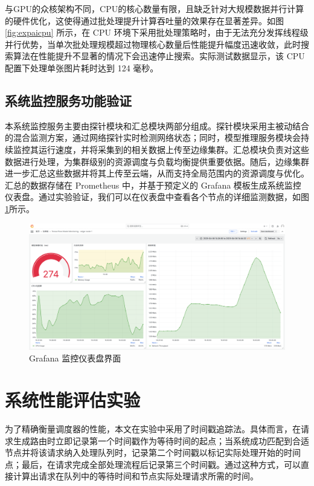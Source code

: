 与GPU的众核架构不同，CPU的核心数量有限，且缺乏针对大规模数据并行计算的硬件优化，这使得通过批处理提升计算吞吐量的效果存在显著差异。如图 \ref{fig:expaicpu} 所示，在 CPU 环境下采用批处理策略时，由于无法充分发挥线程级并行优势，当单次批处理规模超过物理核心数量后性能提升幅度迅速收敛，此时搜索算法在性能提升不显著的情况下会迅速停止搜索。实际测试数据显示，该 CPU 配置下处理单张图片耗时达到 124 毫秒。

\subsection{系统监控服务功能验证}

本系统监控服务主要由探针模块和汇总模块两部分组成。探针模块采用主被动结合的混合监测方案，通过网络探针实时检测网络状态；同时，模型推理服务模块会持续监控其运行速度，并将采集到的相关数据上传至边缘集群。汇总模块负责对这些数据进行处理，为集群级别的资源调度与负载均衡提供重要依据。随后，边缘集群进一步汇总这些数据并将其上传至云端，从而支持全局范围内的资源调度与优化。汇总的数据存储在 Prometheus 中，并基于预定义的 Grafana 模板生成系统监控仪表盘。通过实验验证，我们可以在仪表盘中查看各个节点的详细监测数据，如图\ref{fig:grafana}所示。

\begin{figure}[ht]
  \centering
  \includegraphics[width=\linewidth]{pics/expr/5-6grafana.png}
  \caption{Grafana 监控仪表盘界面}
  \label{fig:grafana}
\end{figure}

\section{系统性能评估实验}

为了精确衡量调度器的性能，本文在实验中采用了时间戳追踪法。具体而言，在请求生成路由时立即记录第一个时间戳作为等待时间的起点；当系统成功匹配到合适节点并将该请求纳入处理队列时，记录第二个时间戳以标记实际处理开始的时间点；最后，在请求完成全部处理流程后记录第三个时间戳。通过这种方式，可以直接计算出请求在队列中的等待时间和节点实际处理请求所需的时间。

